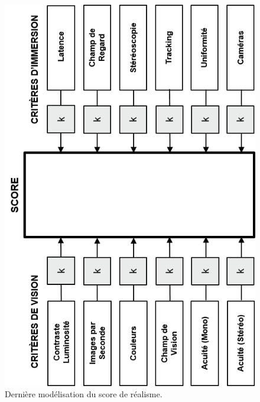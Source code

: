 	\begin{figure}
		\centering
		\includegraphics[scale=1.35]{Figures/ModeleDefinitif}
		\caption{Dernière modélisation du score de réalisme.}
		\label{fig:modèle_définitif}
	\end{figure}